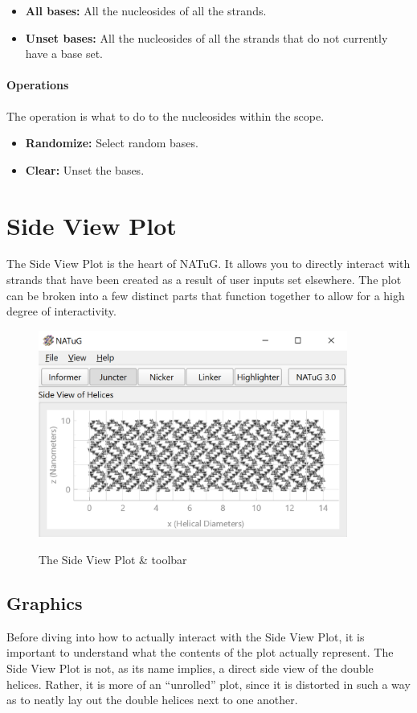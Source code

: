\documentclass[titlepage]{article}
\begin{document}
	\begin{itemize}
		\item \textbf{All bases:} All the nucleosides of all the strands.
		\item \textbf{Unset bases:} All the nucleosides of all the strands that do not currently have a base set.
	\end{itemize}

	\paragraph{Operations}
	The operation is what to do to the nucleosides within the scope.
	
	\begin{itemize}
		\item \textbf{Randomize:} Select random bases.
		\item \textbf{Clear:} Unset the bases.
	\end{itemize}
	
	\section{Side View Plot}
	The Side View Plot is the heart of NATuG. It allows you to directly interact with strands that have been created as a result of user inputs set elsewhere. The plot can be broken into a few distinct parts that function together to allow for a high degree of interactivity. 
	
	\begin{figure}[h]
		\centering
		\caption{The Side View Plot \& toolbar}
		\includegraphics[width=4in]{short-side-view-overview.png}
		\label{fig:short-side-view-overview}
	\end{figure}

	\subsection{Graphics}
	Before diving into how to actually interact with the Side View Plot, it is important to understand what the contents of the plot actually represent. The Side View Plot is not, as its name implies, a direct side view of the double helices. Rather, it is more of an “unrolled” plot, since it is distorted in such a way as to neatly lay out the double helices next to one another.
	
\end{document}
